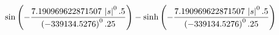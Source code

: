 $$\sin \left(-{{7.190969622871507\,\left| s\right| ^0.5}\over{\left(-
 339134.5276\right)^0.25}}\right)-\sinh \left(-{{7.190969622871507\,
 \left| s\right| ^0.5}\over{\left(-339134.5276\right)^0.25}}\right)$$

